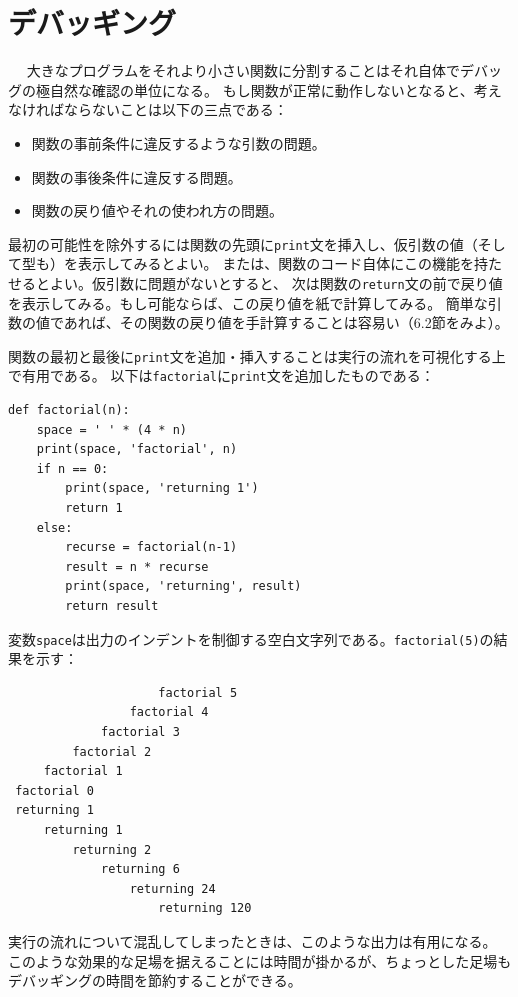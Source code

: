 \documentclass[a4j,12pt,makeidx]{jbook}
\begin{document}
\section{デバッギング}　
大きなプログラムをそれより小さい関数に分割することはそれ自体でデバッグの極自然な確認の単位になる。
もし関数が正常に動作しないとなると、考えなければならないことは以下の三点である：
\begin{itemize}
\item 関数の事前条件に違反するような引数の問題。
\item 関数の事後条件に違反する問題。
\item 関数の戻り値やそれの使われ方の問題。
\end{itemize}
最初の可能性を除外するには関数の先頭に{\tt print}文を挿入し、仮引数の値（そして型も）を表示してみるとよい。
または、関数のコード自体にこの機能を持たせるとよい。仮引数に問題がないとすると、
次は関数の{\tt return}文の前で戻り値を表示してみる。もし可能ならば、この戻り値を紙で計算してみる。
簡単な引数の値であれば、その関数の戻り値を手計算することは容易い（6.2節をみよ）。 \par
関数の最初と最後に{\tt print}文を追加・挿入することは実行の流れを可視化する上で有用である。
以下は{\tt factorial}に{\tt print}文を追加したものである：
\begin{verbatim}
def factorial(n):
    space = ' ' * (4 * n)
    print(space, 'factorial', n)
    if n == 0:
        print(space, 'returning 1')
        return 1
    else:
        recurse = factorial(n-1)
        result = n * recurse
        print(space, 'returning', result)
        return result
\end{verbatim}
変数{\tt space}は出力のインデントを制御する空白文字列である。{\tt factorial(5)}の結果を示す：
\begin{verbatim}
                     factorial 5
                 factorial 4
             factorial 3
         factorial 2
     factorial 1
 factorial 0
 returning 1
     returning 1
         returning 2
             returning 6
                 returning 24
                     returning 120
\end{verbatim}
実行の流れについて混乱してしまったときは、このような出力は有用になる。
このような効果的な足場を据えることには時間が掛かるが、ちょっとした足場もデバッギングの時間を節約することができる。
%
\end{document}
